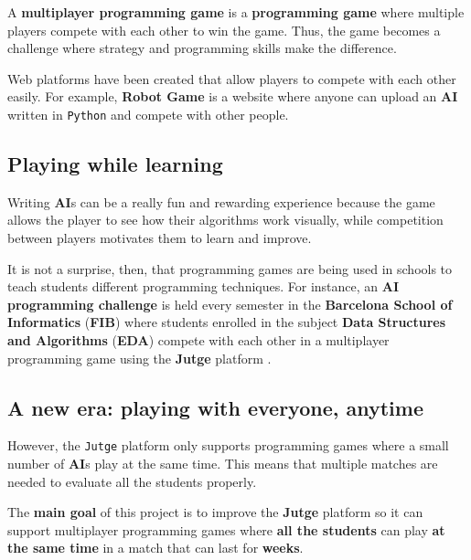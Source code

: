 \documentclass[a4paper,11pt]{article}
\begin{document}
  A \textbf{multiplayer programming game} is a \textbf{programming game} where multiple players compete with each other to win the game.
  Thus, the game becomes a challenge where strategy and programming skills make the difference.

  Web platforms have been created that allow players to compete with each other easily.
  For example, \textbf{Robot Game} \cite{robotgame} is a website where anyone can upload an \textbf{AI} written in \texttt{Python}
  and compete with other people.
\subsection{Playing while learning}
Writing \textbf{AI}s can be a really fun and rewarding experience because the game allows the player to see how their algorithms
  work visually,
  while competition between players motivates them to learn and improve.

  It is not a surprise, then, that programming games are being used in schools to teach students different programming techniques.
  For instance, an \textbf{AI programming challenge} is held every
  semester in the \textbf{Barcelona School of Informatics} (\textbf{FIB}) where students enrolled in the subject
  \textbf{Data Structures and Algorithms} (\textbf{EDA}) \cite{eda} compete with each other in a multiplayer programming game
  using the \textbf{Jutge} platform \cite{jutge}.
\subsection{A new era: playing with everyone, anytime}
 However, the \texttt{Jutge} platform only supports programming games where a small
  number of \textbf{AI}s play at the same time. This means that multiple matches are needed to evaluate all the students properly.

  The \textbf{main goal} of this project is to improve the \textbf{Jutge} platform so it can support multiplayer programming games where
  \textbf{all the students} can play \textbf{at the same time} in a match that can last for \textbf{weeks}.
\clearpage


\end{document}

